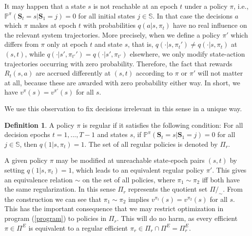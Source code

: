 \documentclass{article}
\theoremstyle{definition}
\newtheorem{definition}[theorem]{Definition}
\numberwithin{equation}{section}
\begin{document}
{It may happen that a state $s$ is not reachable at an epoch $t$ 
under a policy $\pi$, i.e., 
$\mathbb P^\pi(\textbf{S}_t=s|\textbf{S}_1=j)=0$ for all initial states $j\in \mathbb{S}$. In that case the decisions $a$ 
which $\pi$ makes at epoch $t$ with probabilities $q(a|s,\pi_t)$ 
have
no real influence on the relevant system trajectories. More precisely, when we define
a policy $\pi'$ which differs from $\pi$ only at epoch $t$ and state $s$, that is,
$q(\cdot|s,\pi_{t}')\not= q(\cdot|s,\pi_t)$ at $(s,t)$, while $q(\cdot|s',\pi_{t'}') = q(\cdot|s',\pi_{t'})$ elsewhere, we only modify state-action trajectories occurring with 
zero probability. 
Therefore, the fact that
rewards $R_t(s,a)$ are accrued differently at $(s,t)$ according to $\pi$ or $\pi'$
will  not matter at all, because these
are awarded with zero probability either way. In short, we have
$v^\pi(s) = v^{\pi'}(s)$ for all $s$.

We use this observation to fix decisions irrelevant in this sense in a unique way. 
\begin{definition}
    A policy $\pi$ is {\rm regular} if it satisfies the following
    condition: For all decision epochs $t = 1, ..., T-1$ and states $s$, if $\mathbb P^\pi(\textbf{S}_t=s|\textbf{S}_1=j)=0$ for all $j\in \mathbb{S}$, %
    then $q(1|s,\pi_t)=1$. The set of all regular policies is denoted by $\Pi_r$.
\end{definition}

A given policy $\pi$ may be modified at unreachable
state-epoch pairs $(s,t)$ by setting $q(1|s,\pi_t) = 1$, which 
leads to an equivalent regular policy $\pi'$. This gives an equivalence relation
$\sim$ on the set of all policies, where $\pi_1 \sim \pi_2$ iff both have the same regularization.
In this sense $\Pi_r$ represents the quotient set $\Pi/_\sim$.
From the construction we can see that $\pi_1 \sim \pi_2$ implies 
$v^{\pi_1}(s) = v^{\pi_2}(s)$ for all $s$.
This has the important consequence that we may restrict optimization
in program (\ref{program}) to policies in $\Pi_r$. This will do no harm, as
every efficient $\pi\in \Pi^E$ is equivalent to a regular efficient $\pi_r \in \Pi_r \cap \Pi^E
= \Pi_r^E$.







}
\end{document}
